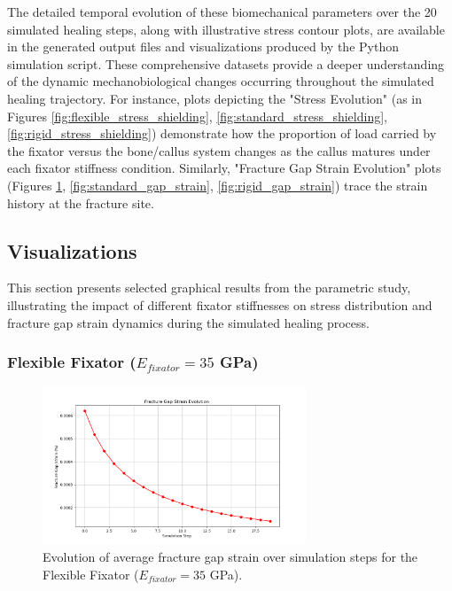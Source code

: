 \documentclass{article}
\begin{document}
The detailed temporal evolution of these biomechanical parameters over the 20 simulated healing steps, along with illustrative stress contour plots, are available in the generated output files and visualizations produced by the Python simulation script. These comprehensive datasets provide a deeper understanding of the dynamic mechanobiological changes occurring throughout the simulated healing trajectory. For instance, plots depicting the "Stress Evolution" (as in Figures \ref{fig:flexible_stress_shielding}, \ref{fig:standard_stress_shielding}, \ref{fig:rigid_stress_shielding}) demonstrate how the proportion of load carried by the fixator versus the bone/callus system changes as the callus matures under each fixator stiffness condition. Similarly, "Fracture Gap Strain Evolution" plots (Figures \ref{fig:flexible_gap_strain}, \ref{fig:standard_gap_strain}, \ref{fig:rigid_gap_strain}) trace the strain history at the fracture site.

\subsection{Visualizations}

This section presents selected graphical results from the parametric study, illustrating the impact of different fixator stiffnesses on stress distribution and fracture gap strain dynamics during the simulated healing process.

\subsubsection{Flexible Fixator (\texorpdfstring{$E_{fixator} = 35$}{E\_fixator = 35} GPa)}

\begin{figure}[htbp]
  \centering
  \includegraphics[width=0.7\textwidth]{../output_advanced/Flexible/gap_strain.png}
  \caption{Evolution of average fracture gap strain over simulation steps for the Flexible Fixator ($E_{fixator} = 35$ GPa).}
  \label{fig:flexible_gap_strain}
\end{figure}
\end{document}
